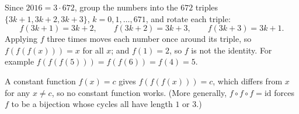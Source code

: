 Since $2016=3\cdot672$, group the numbers into the $672$ triples $\{3k+1,3k+2,3k+3\}$, $k=0,1,\dots,671$, and rotate each triple:
\[
f(3k+1)=3k+2,\qquad f(3k+2)=3k+3,\qquad f(3k+3)=3k+1 .
\]
Applying $f$ three times moves each number once around its triple, so $f(f(f(x)))=x$ for all $x$; and $f(1)=2$, so $f$ is not the identity. For example $f(f(f(5)))=f(f(6))=f(4)=5$.

A constant function $f(x)=c$ gives $f(f(f(x)))=c$, which differs from $x$ for any $x\ne c$, so no constant function works. (More generally, $f\circ f\circ f=\mathrm{id}$ forces $f$ to be a bijection whose cycles all have length $1$ or $3$.)
